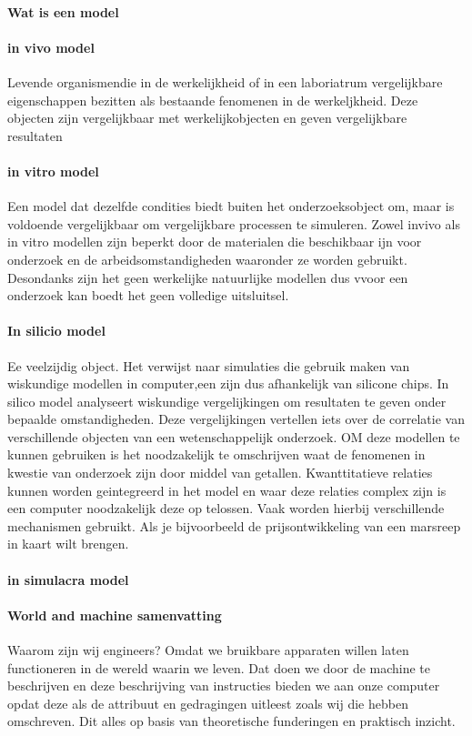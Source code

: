 \paragraph{Wat is een model}

\paragraph{in vivo model}
Levende organismendie in de werkelijkheid of in een laboriatrum vergelijkbare eigenschappen bezitten als bestaande fenomenen in de werkeljkheid. Deze objecten zijn vergelijkbaar met werkelijkobjecten en geven vergelijkbare resultaten
\paragraph{in vitro model}
Een model dat dezelfde condities biedt  buiten het onderzoeksobject om, maar is voldoende vergelijkbaar om vergelijkbare processen te simuleren.
Zowel invivo als in vitro modellen zijn beperkt door de materialen die beschikbaar ijn voor onderzoek en de arbeidsomstandigheden waaronder ze worden gebruikt. Desondanks zijn het geen werkelijke natuurlijke modellen dus vvoor een onderzoek kan boedt het geen volledige uitsluitsel.
\paragraph{In silicio model}
Ee veelzijdig object. Het verwijst naar simulaties die gebruik maken van wiskundige modellen in computer,een zijn dus afhankelijk van silicone chips. In silico model analyseert  wiskundige vergelijkingen om resultaten te geven onder bepaalde omstandigheden. Deze vergelijkingen vertellen iets over de correlatie van verschillende objecten van een wetenschappelijk onderzoek. OM deze modellen te kunnen gebruiken is het noodzakelijk te omschrijven waat de fenomenen in kwestie van onderzoek zijn door middel van getallen. Kwanttitatieve relaties kunnen worden geintegreerd in het model en waar deze relaties complex zijn is een computer noodzakelijk deze op telossen. Vaak worden hierbij verschillende mechanismen gebruikt. Als je bijvoorbeeld de prijsontwikkeling van een marsreep in kaart wilt brengen.
\paragraph{in simulacra model}

\paragraph{World and machine samenvatting}
Waarom zijn wij engineers? Omdat we bruikbare apparaten willen laten functioneren in de wereld waarin we leven. Dat doen we door de machine te beschrijven en deze beschrijving van instructies bieden we aan onze computer opdat deze als de attribuut en gedragingen uitleest zoals wij die hebben omschreven. Dit alles op basis van theoretische funderingen en praktisch inzicht. 

